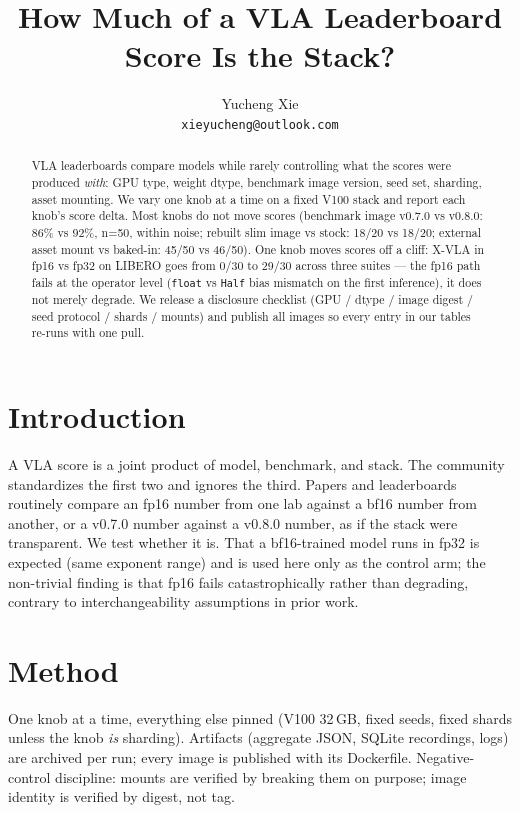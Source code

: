 \documentclass[journal]{IEEEtran}
\title{How Much of a VLA Leaderboard Score Is the Stack?}
\author{
  Yucheng Xie \\
  \texttt{xieyucheng@outlook.com}
}
\begin{document}
\maketitle

\begin{abstract}
VLA leaderboards compare models while rarely controlling what the scores
were produced \emph{with}: GPU type, weight dtype, benchmark image version,
seed set, sharding, asset mounting. We vary one knob at a time on a fixed
V100 stack and report each knob's score delta. Most knobs do not move scores
(benchmark image v0.7.0 vs v0.8.0: 86\% vs 92\%, n=50, within noise; rebuilt
slim image vs stock: 18/20 vs 18/20; external asset mount vs baked-in: 45/50
vs 46/50). One knob moves scores off a cliff: X-VLA in fp16 vs fp32 on
LIBERO goes from 0/30 to 29/30 across three suites --- the fp16 path fails
at the operator level (\texttt{float} vs \texttt{Half} bias mismatch on the
first inference), it does not merely degrade. We release a disclosure
checklist (GPU / dtype / image digest / seed protocol / shards / mounts) and
publish all images so every entry in our tables re-runs with one pull.
\end{abstract}

\section{Introduction}
A VLA score is a joint product of model, benchmark, and stack. The community
standardizes the first two and ignores the third. Papers and leaderboards
routinely compare an fp16 number from one lab against a bf16 number from
another, or a v0.7.0 number against a v0.8.0 number, as if the stack were
transparent. We test whether it is. That a bf16-trained model runs in fp32 is
expected (same exponent range) and is used here only as the control arm; the
non-trivial finding is that fp16 fails catastrophically rather than
degrading, contrary to interchangeability assumptions in prior work.

\section{Method}
One knob at a time, everything else pinned (V100 32\,GB, fixed seeds, fixed
shards unless the knob \emph{is} sharding). Artifacts (aggregate JSON,
SQLite recordings, logs) are archived per run; every image is published with
its Dockerfile. Negative-control discipline: mounts are verified by breaking
them on purpose; image identity is verified by digest, not tag.
\end{document}
